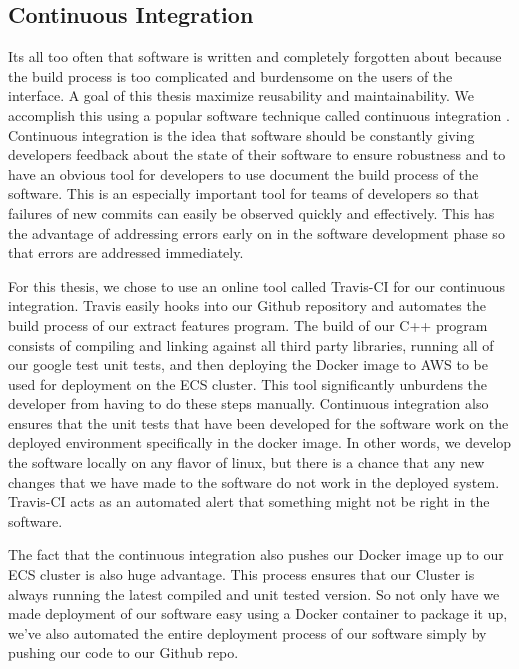 \subsection{\label{subsection:cont_integration}Continuous Integration}
Its all too often that software is written and completely forgotten about
because the build process is too complicated and burdensome on the users of the
interface.  A goal of this thesis maximize reusability and maintainability. We
accomplish this using a  popular software technique called continuous
integration \cite{duvall2007continuous}. Continuous integration is the idea that
software should be constantly giving developers feedback about the state of
their software to ensure robustness and to have an obvious tool for developers
to use document the build process of the software. This is an especially
important tool for teams of developers so that failures of new commits
can easily be observed quickly and effectively. This has the advantage of addressing
errors early on in the software development phase so that errors are addressed
immediately.

For this thesis, we chose to use an online tool called Travis-CI for our
continuous integration. Travis easily hooks into our Github repository and
automates the build process of our extract features program. The build of our
C++ program consists of compiling and linking against all third party libraries,
running all of our google test unit tests, and then deploying the Docker image
to AWS to be used for deployment on the ECS cluster. This tool significantly
unburdens the developer from having to do these steps manually. Continuous
integration also ensures that the unit tests that have been developed for the
software work on the deployed environment specifically in the docker image. In
other words, we develop the software locally on any flavor of linux,  but there
is a chance that any new changes that we have made to the software do not work
in the deployed system. Travis-CI acts as an automated alert that something might
not be right in the software.

The fact that the continuous integration also pushes our Docker image up to  our
ECS cluster is also huge advantage. This process  ensures that  our Cluster is
always running the latest compiled and unit tested version.  So not only have we
made deployment of our software easy using a Docker  container to package it up,
we've also automated the entire deployment process of our software simply by
pushing our code to our Github repo.

